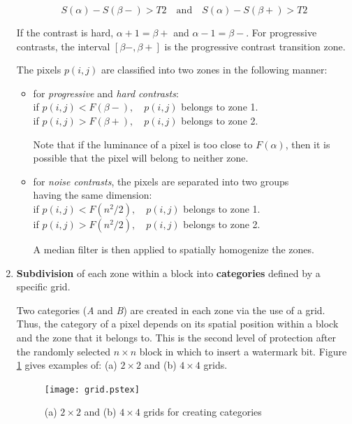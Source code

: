 \documentclass[12pt]{report}
\begin{document}
\begin{enumerate}
		\begin{equation}
			S(\alpha) - S(\beta-) > T2 \quad \mbox{and} \quad S(\alpha) - S(\beta+) > T2
		\end{equation}

		If the contrast is hard, $\alpha + 1 = \beta+$ and $\alpha - 1 = \beta-$.
		For progressive contrasts, the interval $[\beta- , \beta+]$ is the progressive contrast transition zone.

		The pixels $p(i,j)$ are classified into two zones in the following manner:
		\begin{itemize}
				\item 
				\begin{tabbing}
					for \=\emph{progressive} and \emph{hard contrasts}: \\
					\>if $p(i,j) < F(\beta-), \quad p(i,j)$ belongs to zone 1.\\
					\>if $p(i,j) > F(\beta+), \quad p(i,j)$ belongs to zone 2.
				\end{tabbing}
				Note that if the luminance of a pixel is too close to $F(\alpha)$, then
				it is possible that the pixel will belong to neither zone.

				\item 
				\begin{tabbing}
					for \=\emph{noise contrasts}, the pixels are separated into two
					groups \\ having the same dimension: \\
					\>if $p(i,j) < F(n^{2}/2), \quad p(i,j)$ belongs to zone 1. \\
					\>if $p(i,j) > F(n^{2}/2), \quad p(i,j)$ belongs to zone 2. 
				\end{tabbing} 
				A median filter is then applied to spatially homogenize the zones.
		\end{itemize}
			

	\item {\bf Subdivision} of each zone within a block into {\bf categories} defined by a specific grid.

		Two categories (\emph{A} and \emph{B}) are created in each zone via the use of a grid. Thus, the category of a 
		pixel depends on its spatial position within a block and the zone that it belongs to. This is the second
		level of protection after the randomly selected $n \times n$ block in which to insert a watermark bit. Figure
		\ref{figGrids} gives examples of: (a) $2 \times 2$ and (b) $4 \times 4$ grids.
		
		\begin{figure}[htb]
			\begin{center}
				\texttt{[image: grid.pstex]}
				\caption{(a) $2\times2$ and (b) $4\times4$ grids for creating categories}
				\label{figGrids}
			\end{center}
		\end{figure}



\end{enumerate}
\end{document}
